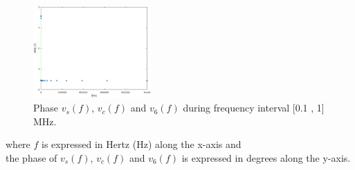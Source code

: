 \begin{figure}[H] \centering
\includegraphics[width=0.4\textwidth]{phase.eps}
\caption{Phase $v_s(f)$,  $v_c(f)$  and $v_6(f)$ during frequency interval [0.1 , 1] MHz.}
\label{fig:LALALAAL}
\end{figure}

where $f$ is expressed in Hertz (Hz) along the x-axis and \\
the phase of $v_s(f)$,  $v_c(f)$  and $v_6(f)$ is expressed in degrees along the y-axis.

